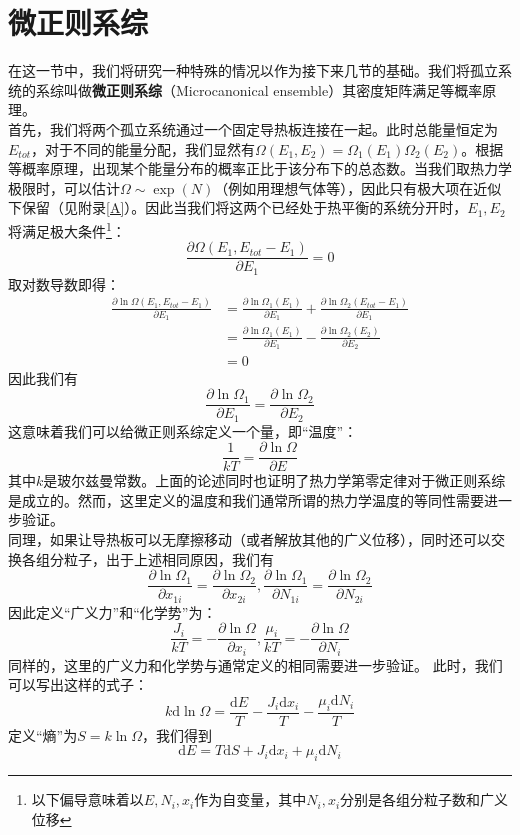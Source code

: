 \documentclass[hyperref,UTF8]{ctexbook}
\begin{document}
\section{微正则系综}
在这一节中，我们将研究一种特殊的情况以作为接下来几节的基础。我们将孤立系统的系综叫做\textbf{微正则系综}（Microcanonical ensemble）其密度矩阵满足等概率原理。\\
\indent 首先，我们将两个孤立系统通过一个固定导热板连接在一起。此时总能量恒定为$E_{tot}$，对于不同的能量分配，我们显然有$\Omega(E_1,E_2)=\Omega_1(E_1)\Omega_2(E_2)$。根据等概率原理，出现某个能量分布的概率正比于该分布下的总态数。当我们取热力学极限时，可以估计$\Omega\sim\exp(N)$（例如用理想气体等），因此只有极大项在近似下保留（见附录\ref{A}）。因此当我们将这两个已经处于热平衡的系统分开时，$E_1,E_2$将满足极大条件\footnote[2]{以下偏导意味着以$E,N_i,x_i$作为自变量，其中$N_i,x_i$分别是各组分粒子数和广义位移}：
\[\frac{\partial\Omega(E_1,E_{tot}-E_1)}{\partial E_1}=0\]
取对数导数即得：
\begin{align*}
	\frac{\partial\ln\Omega(E_1,E_{tot}-E_1)}{\partial E_1}&=\frac{\partial\ln\Omega_1(E_1)}{\partial E_1}+\frac{\partial\ln\Omega_2(E_{tot}-E_1)}{\partial E_1}\\
	&=\frac{\partial\ln\Omega_1(E_1)}{\partial E_1}-\frac{\partial\ln\Omega_2(E_2)}{\partial E_2}\\
	&=0
\end{align*}
因此我们有
\[\frac{\partial\ln\Omega_1}{\partial E_1}=\frac{\partial\ln\Omega_2}{\partial E_2}\]
这意味着我们可以给微正则系综定义一个量，即“温度”：
\[\frac{1}{kT}=\frac{\partial\ln\Omega}{\partial E}\]
其中$k$是玻尔兹曼常数。上面的论述同时也证明了热力学第零定律对于微正则系综是成立的。然而，这里定义的温度和我们通常所谓的热力学温度的等同性需要进一步验证。\\
\indent 同理，如果让导热板可以无摩擦移动（或者解放其他的广义位移），同时还可以交换各组分粒子，出于上述相同原因，我们有
\[\frac{\partial\ln\Omega_1}{\partial x_{1i}}=\frac{\partial\ln\Omega_2}{\partial x_{2i}},\frac{\partial\ln\Omega_1}{\partial N_{1i}}=\frac{\partial\ln\Omega_2}{\partial N_{2i}}\]
因此定义“广义力”和“化学势”为：
\[\frac{J_i}{kT}=-\frac{\partial\ln\Omega}{\partial x_i},\frac{\mu_i}{kT}=-\frac{\partial\ln\Omega}{\partial N_i}\]
同样的，这里的广义力和化学势与通常定义的相同需要进一步验证。
\indent 此时，我们可以写出这样的式子：
\[k\mathrm{d}\ln\Omega=\frac{\mathrm{d}E}{T}-\frac{J_i\mathrm{d}x_i}{T}-\frac{\mu_i\mathrm{d}N_i}{T}\]
定义“熵”为$S=k\ln\Omega$，我们得到
\begin{equation}\label{FundamentalEquation}
	\mathrm{d}E=T\mathrm{d}S+J_i\mathrm{d}x_i+\mu_i\mathrm{d}N_i
\end{equation}
\end{document}
